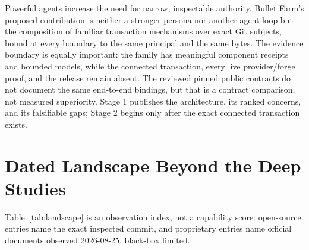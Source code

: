\documentclass[journal]{IEEEtran}
\begin{document}
Powerful agents increase the need for narrow, inspectable authority. Bullet
Farm's proposed contribution is neither a stronger persona nor another agent
loop but the composition of familiar transaction mechanisms over exact Git
subjects, bound at every boundary to the same principal and the same bytes.
The evidence boundary is equally important: the family has meaningful
component receipts and bounded models, while the connected transaction, every
live provider/forge proof, and the release remain absent. The reviewed pinned
public contracts do not document the same end-to-end bindings, but that is a
contract comparison, not measured superiority. Stage 1 publishes the
architecture, its ranked concerns, and its falsifiable gaps; Stage 2 begins
only after the exact connected transaction exists.

\appendices
\section{Dated Landscape Beyond the Deep Studies}
\label{app:landscape}

Table~\ref{tab:landscape} is an observation index, not a capability score:
open-source entries name the exact inspected commit, and proprietary entries
name official documents observed 2026-08-25, black-box limited.
\end{document}
